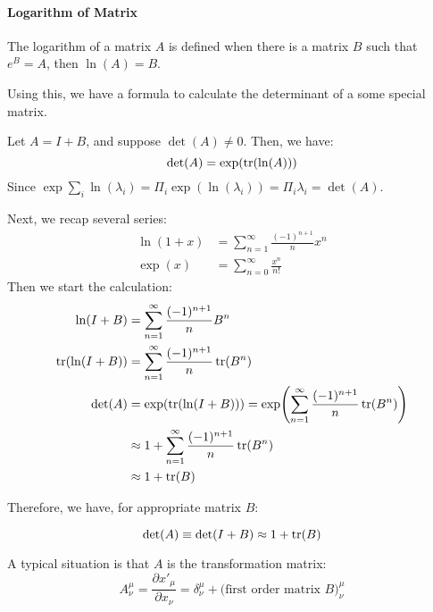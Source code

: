     \paragraph{Logarithm of Matrix}
    The logarithm of  a matrix $A$ is defined when there is a matrix $B$ such that
    $e^B=A$, then $\ln(A)=B$.

    Using this, we have a formula to calculate the determinant of a some special
    matrix.

    Let $A = I + B$, and suppose $\det(A)\neq
    0$. Then, we have:
    \begin{equation}
        \det(A) = \exp(\tr(\ln(A)))
    \end{equation}
    Since $\exp{\sum_i \ln(\lambda_i)} = \Pi_i \exp(\ln(\lambda_i))=\Pi_i
    \lambda_i=\det(A)$.

    Next, we recap several series:
    \begin{align*}
        \ln(1+x) &= \sum_{n=1}^{\infty} \frac{(-1)^{n+1}}{n}x^n \\
        \exp(x) &= \sum_{n=0}^{\infty} \frac{x^n}{n!}
    \end{align*}
    Then we start the calculation:
    \begin{align*}
        \ln(I+B) &= \sum_{n=1}^{\infty} \frac{(-1)^{n+1}}{n}B^n \\
        \tr(\ln(I+B)) &= \sum_{n=1}^{\infty} \frac{(-1)^{n+1}}{n}\tr(B^n) \\
        \det(A) &= \exp(\tr(\ln(I+B))) 
            = \exp(\sum_{n=1}^{\infty} \frac{(-1)^{n+1}}{n}\tr(B^n)) \\
            &\approx 1+ \sum_{n=1}^{\infty} \frac{(-1)^{n+1}}{n}\tr(B^n) \\
            &\approx 1+ \tr(B)
    \end{align*}

    Therefore, we have, for appropriate matrix $B$:
    \begin{thm}
    \begin{equation}
        \det(A) \equiv \det(I+B) \approx 1+\tr(B)
    \end{equation}
    \end{thm}
    
    A typical situation is that $A$ is the transformation matrix:
    \begin{equation}
        A^\mu_\nu = \frac{\partial x'_\mu}{\partial x_\nu} 
        = \delta^\mu_\nu + \text{(first order matrix $B$)}^\mu_\nu
    \end{equation}
